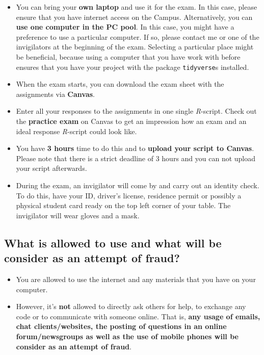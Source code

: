 \documentclass[
]{scrartcl}
\providecommand{\tightlist}{%
  \setlength{\itemsep}{0pt}\setlength{\parskip}{0pt}}
\begin{document}
\begin{itemize}
\tightlist
\item
  You can bring your \textbf{own laptop} and use it for the exam. In this case, please ensure that you have internet access on the Campus. Alternatively, you can \textbf{use one computer in the PC pool}. In this case, you might have a preference to use a particular computer. If so, please contact me or one of the invigilators at the beginning of the exam. Selecting a particular place might be beneficial, because using a computer that you have work with before ensures that you have your project with the package \texttt{tidyverse}s installed.
\item
  When the exam starts, you can download the exam sheet with the assignments via \textbf{Canvas}.
\item
  Enter all your responses to the assignments in one single \emph{R}-script. Check out the \textbf{practice exam} on Canvas to get an impression how an exam and an ideal response \emph{R}-script could look like.
\item
  You have \textbf{3 hours} time to do this and to \textbf{upload your script to Canvas}. Please note that there is a strict deadline of 3 hours and you can not upload your script afterwards.
\item
  During the exam, an invigilator will come by and carry out an identity check. To do this, have your ID, driver's license, residence permit or possibly a physical student card ready on the top left corner of your table. The invigilator will wear gloves and a mask.
\end{itemize}

\hypertarget{what-is-allowed-to-use-and-what-will-be-consider-as-an-attempt-of-fraud}{%
\subsection*{What is allowed to use and what will be consider as an attempt of fraud?}\label{what-is-allowed-to-use-and-what-will-be-consider-as-an-attempt-of-fraud}}

\begin{itemize}
\tightlist
\item
  You are allowed to use the internet and any materials that you have on your computer.
\item
  However, it's \textbf{not} allowed to directly ask others for help, to exchange any code or to communicate with someone online. That is, \textbf{any usage of emails, chat clients/websites, the posting of questions in an online forum/newsgroups as well as the use of mobile phones will be consider as an attempt of fraud}.
\end{itemize}
\end{document}
